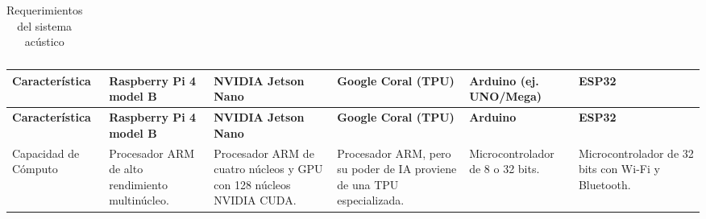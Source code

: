{\begin{longtable}[c]{c p{3.5cm} p{2.2cm} p{2.2cm} p{3.5cm}}
    \caption{Requerimientos del sistema acústico}
    \label{tab:requerimientos_sistema_acustico}
  \end{longtable}
}


{\small
  \begin{longtable}[c]{p{2.2cm} p{2.4cm} p{2.4cm} p{2.4cm} p{2.4cm} p{2.4cm}}
    \hline
    \textbf{Característica}                                                &
    \textbf{Raspberry Pi 4 model B}                                        &
    \textbf{NVIDIA Jetson Nano}                                            &
    \textbf{Google Coral (TPU)}                                            &
    \textbf{Arduino (ej. UNO/Mega)}                                        &
    \textbf{ESP32}                                                           \\
    \hline
    \endfirsthead

    \hline
    \textbf{Característica}                                                &
    \textbf{Raspberry Pi 4 model B}                                        &
    \textbf{NVIDIA Jetson Nano}                                            &
    \textbf{Google Coral (TPU)}                                            &
    \textbf{Arduino}                                                       &
    \textbf{ESP32}                                                           \\
    \hline
    \endhead
    \endfoot
    \endlastfoot

    Capacidad de Cómputo                                                   &
    Procesador ARM de alto rendimiento multinúcleo.                        &
    Procesador ARM de cuatro núcleos y GPU con 128 núcleos NVIDIA CUDA.    &
    Procesador ARM, pero su poder de IA proviene de una TPU especializada. &
    Microcontrolador de 8 o 32 bits.                                       &
    Microcontrolador de 32 bits con Wi-Fi y Bluetooth.                       \\


\end{longtable}}
